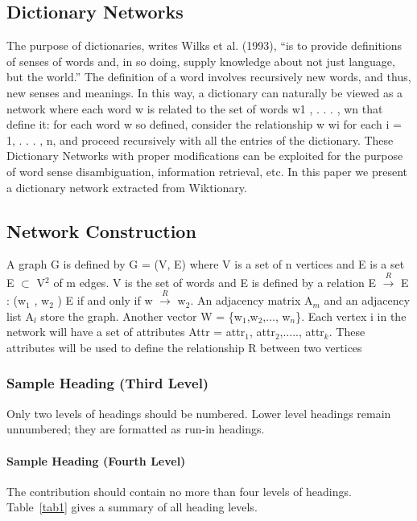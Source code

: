 \documentclass[runningheads]{llncs}
\begin{document}
\subsection{Dictionary Networks}
The purpose of dictionaries, writes Wilks et al. (1993), “is to provide definitions of senses of words and, in so doing, supply knowledge about not just language, but the world.” The definition of a word involves recursively new words, and thus, new senses and meanings. In this way, a dictionary can naturally be viewed as a network where each word w is related to the set of words w{\scriptsize 1} , . . . , w{\scriptsize n} that define it: for each word w so defined, consider the relationship w \textrightarrow  w{\scriptsize i} for each i = 1, . . . , n, and proceed recursively with all the entries of the dictionary.\linebreak
These Dictionary Networks with proper modifications can be exploited for the purpose of word sense disambiguation, information retrieval, etc. In this paper we present a dictionary network extracted from Wiktionary. 
\subsection{Network Construction}
A graph G is defined by G = (V, E) where V is a set of n vertices and E is a set  E $\subset$ V$^{2}$   of m edges. V is the set of words and E is defined by a relation E $\xrightarrow{R}$ E : (w$_{1}$ , w$_{2}$ )  E if and only if w $\xrightarrow{R}$ w$_{2}$. An adjacency matrix A$_{m}$ and an adjacency list A$_{l}$ store the graph. Another vector W = \{w$_{1}$,w$_{2}$,..., w$_{n}$\}. Each vertex i in the network will have a set of attributes Attr = {attr$_{1}$, attr$_{2}$,....., attr$_{k}$}. These attributes will be used to define the relationship R between two vertices


\subsubsection{Sample Heading (Third Level)} Only two levels of
headings should be numbered. Lower level headings remain unnumbered;
they are formatted as run-in headings.

\paragraph{Sample Heading (Fourth Level)}
The contribution should contain no more than four levels of
headings. Table~\ref{tab1} gives a summary of all heading levels.
\end{document}
